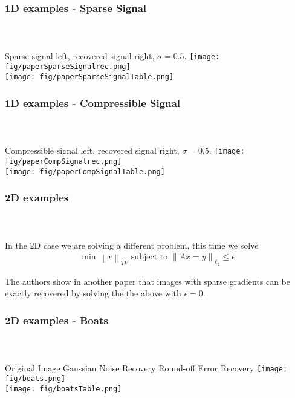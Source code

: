 \documentclass[mathserif,18pt,xcolor=table]{beamer}
\newcommand{\norm}[1]{\left\lVert #1 \right\rVert}
\begin{document}

\begin{frame}[t]
\frametitle{1D examples - Sparse Signal}
\framesubtitle{~~}  %


\centering
Sparse signal left, recovered signal right, $\sigma = 0.5$.
\texttt{[image: fig/paperSparseSignalrec.png]}
\\
\texttt{[image: fig/paperSparseSignalTable.png]}


\end{frame}






\begin{frame}[t]
\frametitle{1D examples - Compressible Signal}
\framesubtitle{~~}  %


\centering
Compressible signal left, recovered signal right, $\sigma = 0.5$.
\texttt{[image: fig/paperCompSignalrec.png]}
\\
\texttt{[image: fig/paperCompSignalTable.png]}

\end{frame}


\begin{frame}[t]
\frametitle{2D examples}
\framesubtitle{~~}  %


In the 2D case we are solving a different problem, this time we solve
\begin{align*}
	\min \norm{x}_{TV} \text{ subject to } \norm{Ax = y}_{\ell_2} \leq \epsilon
\end{align*}

The authors show in another paper that images with sparse gradients can be exactly recovered by solving the the above with $\epsilon = 0$.

\end{frame}




\begin{frame}[t]
\frametitle{2D examples - Boats}
\framesubtitle{~~}  %


\quad\qquad Original Image \qquad  Gaussian Noise Recovery \hspace{2pt} Round-off Error Recovery
\centering
\texttt{[image: fig/boats.png]}
\\
\texttt{[image: fig/boatsTable.png]}

\end{frame}
\end{document}
